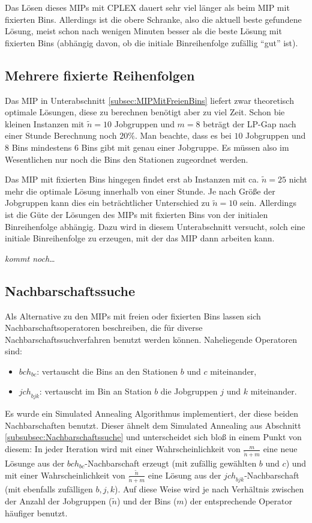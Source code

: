 \documentclass{scrreprt}
\begin{document}
Das Lösen dieses MIPs mit CPLEX dauert sehr viel länger als beim MIP mit fixierten Bins.
Allerdings ist die obere Schranke, also die aktuell beste gefundene Lösung, meist schon nach wenigen Minuten besser als die
beste Lösung mit fixierten Bins (abhängig davon, ob die initiale Binreihenfolge zufällig "`gut"' ist).

\subsection{Mehrere fixierte Reihenfolgen}
Das MIP in Unterabschnitt \ref{subsec:MIPMitFreienBins} liefert zwar theoretisch optimale Lösungen, diese zu berechnen benötigt aber zu viel Zeit.
Schon bie kleinen Instanzen mit $\tilde{n}=10$ Jobgruppen und $m=8$ beträgt der LP-Gap nach einer Stunde Berechnung noch $20\%$.
Man beachte, dass es bei $10$ Jobgruppen und $8$ Bins mindestens $6$ Bins gibt mit genau einer Jobgruppe.
Es müssen also im Wesentlichen nur noch die Bins den Stationen zugeordnet werden.

Das MIP mit fixierten Bins hingegen findet erst ab Instanzen mit ca. $\tilde{n}=25$ nicht mehr die optimale Lösung innerhalb von einer Stunde.
Je nach Größe der Jobgruppen kann dies ein beträchtlicher Unterschied zu $\tilde{n}=10$ sein. 
Allerdings ist die Güte der Lösungen des MIPs mit fixierten Bins von der initialen Binreihenfolge abhängig.
Dazu wird in diesem Unterabschnitt versucht, solch eine initiale Binreihenfolge zu erzeugen, mit der das MIP dann arbeiten kann.

\textit{kommt noch\ldots}

\subsection{Nachbarschaftssuche}
Als Alternative zu den MIPs mit freien oder fixierten Bins lassen sich Nachbarschaftsoperatoren beschreiben, 
die für diverse Nachbarschaftssuchverfahren benutzt werden können.
Naheliegende Operatoren sind:
\begin{itemize}
    \item $\mathit{bch}_{bc}$: vertauscht die Bins an den Stationen $b$ und $c$ miteinander,
    \item $\mathit{jch}_{bjk}$: vertauscht im Bin an Station $b$ die Jobgruppen $j$ und $k$ miteinander.
\end{itemize}
Es wurde ein Simulated Annealing Algorithmus implementiert, der diese beiden Nachbarschaften benutzt.
Dieser ähnelt dem Simulated Annealing aus Abschnitt \ref{subsubsec:Nachbarschaftssuche} und unterscheidet sich bloß in einem Punkt von diesem:
In jeder Iteration wird mit einer Wahrscheinlichkeit von $\frac{m}{\tilde{n}+m}$ eine neue Lösunge aus der $\mathit{bch}_{bc}$-Nachbarschaft erzeugt 
(mit zufällig gewählten $b$ und $c$) und mit einer Wahrscheinlichkeit von $\frac{\tilde{n}}{\tilde{n}+m}$ eine Lösung aus der $\mathit{jch}_{bjk}$-Nachbarschaft
(mit ebenfalls zufälligen $b,j,k$).
Auf diese Weise wird je nach Verhältnis zwischen der Anzahl der Jobgruppen ($\tilde{n}$) und der Bins ($m$) der entsprechende Operator häufiger benutzt.
\end{document}
